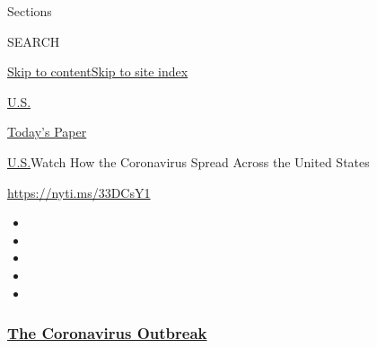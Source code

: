 Sections

SEARCH

\protect\hyperlink{site-content}{Skip to
content}\protect\hyperlink{site-index}{Skip to site index}

\href{https://www.nytimes3xbfgragh.onion/section/us}{U.S.}

\href{https://myaccount.nytimes3xbfgragh.onion/auth/login?response_type=cookie\&client_id=vi}{}

\href{https://www.nytimes3xbfgragh.onion/section/todayspaper}{Today's
Paper}

\href{/section/us}{U.S.}\textbar{}Watch How the Coronavirus Spread
Across the United States

\url{https://nyti.ms/33DCsY1}

\begin{itemize}
\item
\item
\item
\item
\item
\end{itemize}

\hypertarget{the-coronavirus-outbreak}{%
\subsubsection{\texorpdfstring{\href{https://www.nytimes3xbfgragh.onion/news-event/coronavirus?name=styln-coronavirus-national\&region=TOP_BANNER\&block=storyline_menu_recirc\&action=click\&pgtype=Interactive\&impression_id=fc44f220-f4bb-11ea-b769-7b51bbcc4e11\&variant=undefined}{The
Coronavirus
Outbreak}}{The Coronavirus Outbreak}}\label{the-coronavirus-outbreak}}


